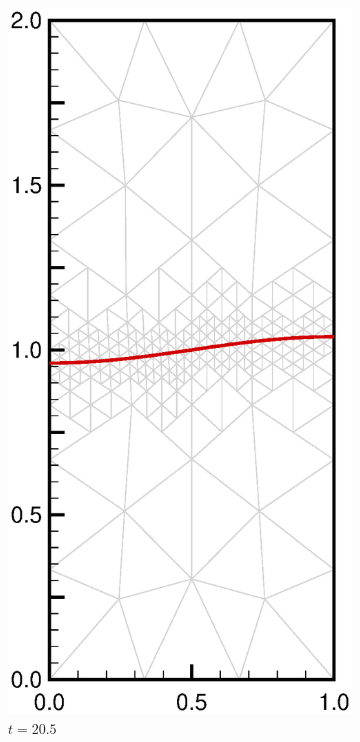 \documentclass[11pt,a4paper,twoside]{article}
\begin{document}
\begin{figure}[ht!]
\begin{center}
\begin{subfigure}[]{0.2\textwidth}
				\includegraphics[width=\textwidth]{SW_N5_L3_6.eps}
				\caption{$ t =20.5 $}
			\end{subfigure}
			~
			\begin{subfigure}[]{0.2\textwidth}

\end{subfigure}
\end{center}
\end{figure}
\end{document}
